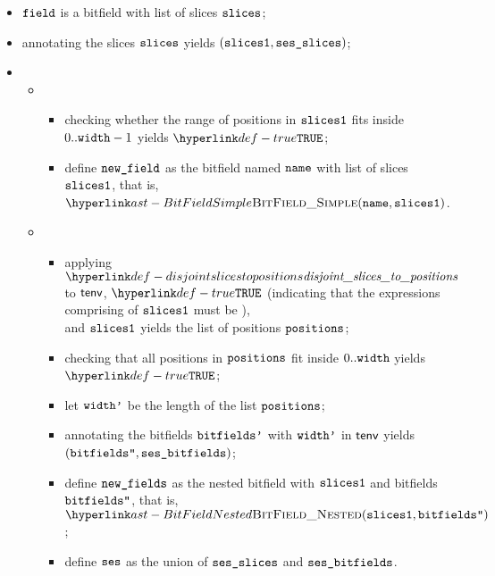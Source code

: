\ProseParagraph
\begin{itemize}
  \item $\texttt{field}$ is a bitfield with list of slices $\texttt{slices}$;
  \item annotating the slices $\texttt{slices}$ yields $(\texttt{slices1}, \texttt{ses\_slices})$\ProseOrTypeError;
  \item \OneApplies
  \begin{itemize}
    \item {}
    \begin{itemize}
      \item checking whether the range of positions in $\texttt{slices1}$ fits inside $0..\texttt{width}-1$ yields $\True$\ProseOrTypeError;
      \item define $\texttt{new\_field}$ as the bitfield named $\texttt{name}$ with list of slices $\texttt{slices1}$, that is, $\BitFieldSimple(\name, \slicesone)$.
    \end{itemize}

    \item {}
    \begin{itemize}
      \item applying $\disjointslicestopositions$ to $\textsf{tenv}$,
            $\True$ (indicating that the expressions comprising of $\texttt{slices1}$ must be \staticallyevaluable), \\
            and $\texttt{slices1}$
            yields the list of positions $\texttt{positions}$\ProseOrTypeError;
      \item checking that all positions in $\texttt{positions}$ fit inside $0..\texttt{width}$ yields \\
            $\True$\ProseOrTypeError;
      \item let $\texttt{width'}$ be the length of the list $\texttt{positions}$;
      \item annotating the bitfields $\texttt{bitfields'}$ with $\texttt{width'}$ in \staticenvironmentterm{} $\textsf{tenv}$ yields $ (\texttt{bitfields''}, \texttt{ses\_bitfields})$\ProseOrTypeError;
      \item define $\texttt{new\_fields}$ as the nested bitfield with $\texttt{slices1}$ and bitfields \\
            $\texttt{bitfields''}$, that is, $\BitFieldNested(\slicesone, \bitfieldspp)$;
      \item define $\texttt{ses}$ as the union of $\texttt{ses\_slices}$ and $\texttt{ses\_bitfields}$.
    \end{itemize}


\end{itemize}
\end{itemize}
